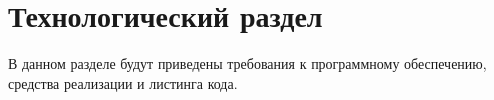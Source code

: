 \chapter{Технологический раздел}

В данном разделе будут приведены требования к программному обеспечению, средства реализации и листинга кода.
